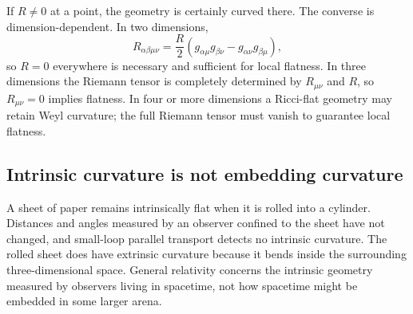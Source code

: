 \begin{classroomqa}
\end{classroomqa}

If \(R\neq0\) at a point, the geometry is certainly curved there. The
converse is dimension-dependent. In two dimensions,
\begin{equation}
  R_{\alpha\beta\mu\nu}
  =
  \frac{R}{2}
  \left(
    g_{\alpha\mu}g_{\beta\nu}
    -
    g_{\alpha\nu}g_{\beta\mu}
  \right),
  \label{eq:l08-riemann-two-dimensional}
\end{equation}
so \(R=0\) everywhere is necessary and sufficient for local flatness.
In three dimensions the Riemann tensor is completely determined by
\(R_{\mu\nu}\) and \(R\), so \(R_{\mu\nu}=0\) implies flatness. In four
or more dimensions a Ricci-flat geometry may retain Weyl curvature; the
full Riemann tensor must vanish to guarantee local flatness.

\begin{classroomqa}
\end{classroomqa}

\subsection{Intrinsic curvature is not embedding curvature}

A sheet of paper remains intrinsically flat when it is rolled into a
cylinder. Distances and angles measured by an observer confined to the
sheet have not changed, and small-loop parallel transport detects no
intrinsic curvature. The rolled sheet does have extrinsic curvature
because it bends inside the surrounding three-dimensional space. General
relativity concerns the intrinsic geometry measured by observers living
in spacetime, not how spacetime might be embedded in some larger arena.


